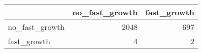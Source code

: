 
\begin{tabular}{lrr}
\toprule
  & no\_fast\_growth & fast\_growth\\
\midrule
no\_fast\_growth & 2048 & 697\\
fast\_growth & 4 & 2\\
\bottomrule
\end{tabular}